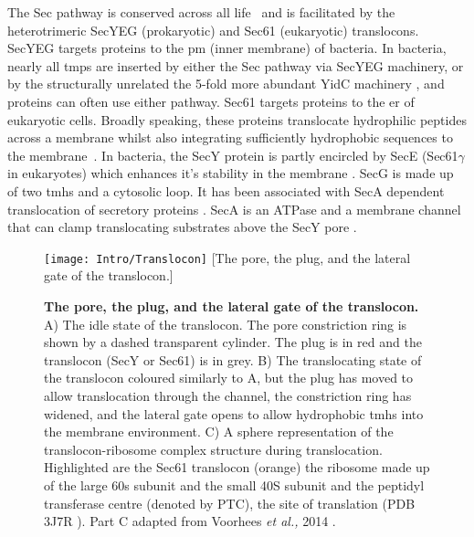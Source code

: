 The Sec pathway is conserved across all life~\cite{Cao2003} and is facilitated by the heterotrimeric SecYEG (prokaryotic) and Sec61 (eukaryotic) translocons.
SecYEG targets proteins to the \gls{pm} (inner membrane) of bacteria.
In bacteria, nearly all \gls{tmp}s are inserted by either the Sec pathway via  SecYEG machinery, or by the structurally unrelated the 5\--fold more abundant YidC machinery \cite{Drew2003, Dalbey2014}, and proteins can often use either pathway.
Sec61 targets proteins to the \gls{er} of eukaryotic cells.
Broadly speaking, these proteins translocate hydrophilic peptides across a membrane whilst also integrating sufficiently hydrophobic sequences to the membrane~\cite{Junne2010, Park2012, Shao2011, Cymer2015}.
In bacteria, the SecY protein is partly encircled by SecE (Sec61$\gamma$ in eukaryotes) which enhances it's stability in the membrane \cite{Kihara1995}.
SecG is made up of two \gls{tmh}s and a cytosolic loop.
It has been associated with SecA dependent translocation of secretory proteins \cite{Duong1997, Koch2000}.
SecA is an ATPase and a membrane channel that can clamp translocating substrates above the SecY pore \cite{Zimmer2008}.

\begin{figure}[ht!]
\centering
\texttt{[image: Intro/Translocon]}
	 [The pore, the plug, and the lateral gate of the translocon.]{\textbf{The pore, the plug, and the lateral gate of the translocon.}
	 A) The idle state of the translocon.
	 The pore constriction ring is shown by a dashed transparent cylinder.
	 The plug is in red and the translocon (SecY or Sec61) is in grey.
	 B) The translocating state of the translocon coloured similarly to A, but the plug has moved to allow translocation through the channel, the constriction ring has widened, and the lateral gate opens to allow hydrophobic \gls{tmh}s into the membrane environment.
	 C) A sphere representation of the translocon-ribosome complex structure during translocation.
	 Highlighted are the Sec61 translocon (orange) the ribosome made up of the large 60s subunit and the small 40S subunit and the peptidyl transferase centre (denoted by PTC), the site of translation (PDB 3J7R \cite{Voorhees2014}).
	 Part C adapted from Voorhees \textit{et al.,} 2014 \cite{Voorhees2014}.

	 }
\label{fig:Translocon}
\end{figure}

